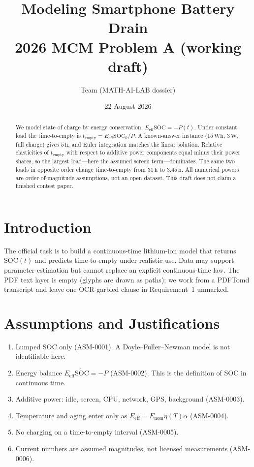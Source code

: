 \documentclass[11pt,letterpaper]{article}
\title{Modeling Smartphone Battery Drain\\[0.4em]
\large 2026 MCM Problem A (working draft)}
\author{Team (MATH-AI-LAB dossier)}
\date{22 August 2026}
\begin{document}
\maketitle
\begin{abstract}
We model state of charge by energy conservation,
\(E_{\mathrm{eff}}\dot{\mathrm{SOC}}=-P(t)\).
Under constant load the time-to-empty is \(t_{\mathrm{empty}}=E_{\mathrm{eff}}\mathrm{SOC}_0/P\).
A known-answer instance (\(15\,\mathrm{Wh}\), \(3\,\mathrm{W}\), full charge) gives \(5\,\mathrm{h}\),
and Euler integration matches the linear solution.
Relative elasticities of \(t_{\mathrm{empty}}\) with respect to additive power components equal
minus their power shares, so the largest load---here the assumed screen term---dominates.
The same two loads in opposite order change time-to-empty from \(31\,\mathrm{h}\) to \(3.45\,\mathrm{h}\).
All numerical powers are order-of-magnitude assumptions, not an open dataset.
This draft does not claim a finished contest paper.
\end{abstract}

\section{Introduction}
The official task is to build a continuous-time lithium-ion model that returns \(\mathrm{SOC}(t)\)
and predicts time-to-empty under realistic use.
Data may support parameter estimation but cannot replace an explicit continuous-time law.
The PDF text layer is empty (glyphs are drawn as paths); we work from a PDFTomd transcript
and leave one OCR-garbled clause in Requirement~1 unmarked.

\section{Assumptions and Justifications}
\begin{enumerate}
\item Lumped SOC only (ASM-0001). A Doyle--Fuller--Newman model is not identifiable here.
\item Energy balance \(E_{\mathrm{eff}}\dot{\mathrm{SOC}}=-P\) (ASM-0002). This is the definition of SOC in continuous time.
\item Additive power: idle, screen, CPU, network, GPS, background (ASM-0003).
\item Temperature and aging enter only as \(E_{\mathrm{eff}}=E_{\mathrm{nom}}\eta(T)\alpha\) (ASM-0004).
\item No charging on a time-to-empty interval (ASM-0005).
\item Current numbers are assumed magnitudes, not licensed measurements (ASM-0006).
\end{enumerate}
\end{document}
